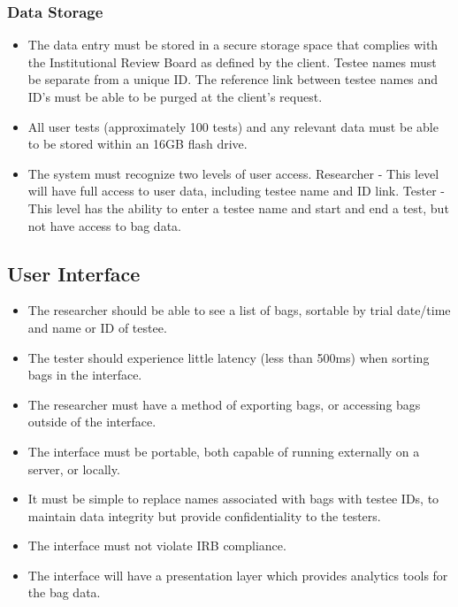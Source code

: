 \documentclass[onecolumn, draftclsnofoot,10pt, compsoc]{IEEEtran}
\begin{document}
\subsubsection{Data Storage}
\begin{itemize}
	\item The data entry must be stored in a secure storage space that complies with the Institutional Review Board as defined by the client.
	\subitem Testee names must be separate from a unique ID.
	\subitem The reference link between testee names and ID's must be able to be purged at the client's request.
	\item All user tests (approximately 100 tests) and any relevant data must be able to be stored within an 16GB flash drive.
	\item The system must recognize two levels of user access.
	\subitem Researcher - This level will have full access to user data, including testee name and ID link.
	\subitem Tester - This level has the ability to enter a testee name and start and end a test, but not have access to bag data.
\end{itemize}
\subsection{User Interface}
\begin{itemize}
	\item The researcher should be able to see a list of bags, sortable by trial date/time and name or ID of testee.
	\item The tester should experience little latency (less than 500ms) when sorting bags in the interface.
	\item The researcher must have a method of exporting bags, or accessing bags outside of the interface.
	\item The interface must be portable, both capable of running externally on a server, or locally.
	\item It must be simple to replace names associated with bags with testee IDs, to maintain data integrity but provide confidentiality to the testers.
	\item The interface must not violate IRB compliance.
	\item The interface will have a presentation layer which provides analytics tools for the bag data.
\end{itemize}
\end{document}
